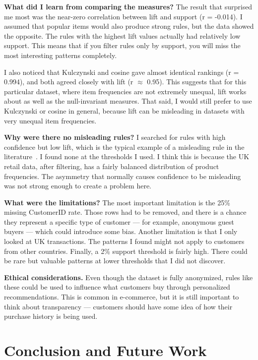 \documentclass[conference]{IEEEtran}
\begin{document}
\textbf{What did I learn from comparing the measures?} The result that surprised me most was the near-zero correlation between lift and support (r = -0.014). I assumed that popular items would also produce strong rules, but the data showed the opposite. The rules with the highest lift values actually had relatively low support. This means that if you filter rules only by support, you will miss the most interesting patterns completely.

I also noticed that Kulczynski and cosine gave almost identical rankings (r = 0.994), and both agreed closely with lift (r $\approx$ 0.95). This suggests that for this particular dataset, where item frequencies are not extremely unequal, lift works about as well as the null-invariant measures. That said, I would still prefer to use Kulczynski or cosine in general, because lift can be misleading in datasets with very unequal item frequencies.

\textbf{Why were there no misleading rules?} I searched for rules with high confidence but low lift, which is the typical example of a misleading rule in the literature~\cite{b3}. I found none at the thresholds I used. I think this is because the UK retail data, after filtering, has a fairly balanced distribution of product frequencies. The asymmetry that normally causes confidence to be misleading was not strong enough to create a problem here.

\textbf{What were the limitations?} The most important limitation is the 25\% missing CustomerID rate. Those rows had to be removed, and there is a chance they represent a specific type of customer — for example, anonymous guest buyers — which could introduce some bias. Another limitation is that I only looked at UK transactions. The patterns I found might not apply to customers from other countries. Finally, a 2\% support threshold is fairly high. There could be rare but valuable patterns at lower thresholds that I did not discover.

\textbf{Ethical considerations.} Even though the dataset is fully anonymized, rules like these could be used to influence what customers buy through personalized recommendations. This is common in e-commerce, but it is still important to think about transparency — customers should have some idea of how their purchase history is being used.

\section{Conclusion and Future Work}
\label{sec:conclusion}
\end{document}
